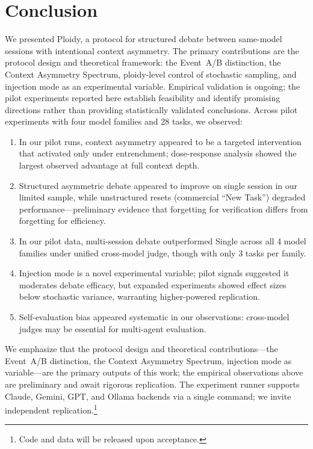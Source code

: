 \documentclass{article}
\begin{document}
\section{Conclusion}
\label{sec:conclusion}

We presented Ploidy, a protocol for structured debate between same-model sessions with intentional context asymmetry. The primary contributions are the protocol design and theoretical framework: the Event~A/B distinction, the Context Asymmetry Spectrum, ploidy-level control of stochastic sampling, and injection mode as an experimental variable. Empirical validation is ongoing; the pilot experiments reported here establish feasibility and identify promising directions rather than providing statistically validated conclusions. Across pilot experiments with four model families and 28 tasks, we observed:
\begin{enumerate}[label=(\arabic*), leftmargin=2em, itemsep=1pt]
  \item In our pilot runs, context asymmetry appeared to be a targeted intervention that activated only under entrenchment; dose-response analysis showed the largest observed advantage at full context depth.
  \item Structured asymmetric debate appeared to improve on single session in our limited sample, while unstructured resets (commercial ``New Task'') degraded performance---preliminary evidence that forgetting for verification differs from forgetting for efficiency.
  \item In our pilot data, multi-session debate outperformed Single across all 4 model families under unified cross-model judge, though with only 3 tasks per family.
  \item Injection mode is a novel experimental variable; pilot signals suggested it moderates debate efficacy, but expanded experiments showed effect sizes below stochastic variance, warranting higher-powered replication.
  \item Self-evaluation bias appeared systematic in our observations: cross-model judges may be essential for multi-agent evaluation.
\end{enumerate}
We emphasize that the protocol design and theoretical contributions---the Event~A/B distinction, the Context Asymmetry Spectrum, injection mode as variable---are the primary outputs of this work; the empirical observations above are preliminary and await rigorous replication. The experiment runner supports Claude, Gemini, GPT, and Ollama backends via a single command; we invite independent replication.\footnote{Code and data will be released upon acceptance.}
\end{document}

